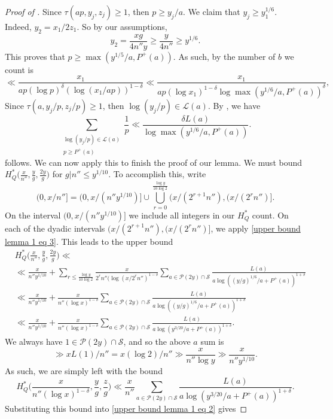 \documentclass{amsart}
\theoremstyle{definition}
\numberwithin{equation}{section}
\renewcommand{\S}{\mathcal{S}}
\newcommand{\density}{\delta}
\begin{document}
\begin{proof}[Proof of ]
		Since $\tau(ap,y_{j},z_j) \geq 1$, then $p \geq y_j/a.$ We claim that $y_j \geq y_1^{1/6}$. Indeed, $y_2 = x_1/2z_1.$ So by our assumptions,
		$$y_2 = \frac{x g}{4n'' y} \geq \frac{y}{4n''} \geq y^{1/6}.$$
		This proves that $p \geq \max(y^{1/5}/a,P^+(a))$. As such, by  the number of $b$ we count is
		$$\ll \frac{x_1}{ap (\log p)^\density (\log(x_1/ap))^{1-\density}} \ll \frac{x_1}{ap (\log x_1)^{1-\density} \log \max(y^{1/6}/a,P^+(a))^\density},$$
		Since $\tau(a,y_j/p,z_j/p) \geq 1$, then $\log(y_j/p) \in \mathscr{L}(a)$. By , we have
		$$\sum_{\substack{\log(y_j/p) \in \mathscr{L}(a) \\ p \geq P^+(a)}} \frac{1}{p} \ll  \frac{\density L(a)}{\log \max(y^{1/6}/a,P^+(a))}.$$
		 follows. We can now apply this to finish the proof of our lemma. We must bound $H^*_Q \big(\frac{x}{n''},\frac{y}{g},\frac{2y}{g}\big)$ for $g|n'' \leq y^{1/10}$. To accomplish this, write $$(0,x/n''] = (0,x/(n'' y^{1/10})] \cup \bigcup_{r = 0}^{\frac{\log y}{10 \log 2}} (x/(2^{r+1}n''),(x/(2^{r}n'')].$$
		On the interval $(0,x/(n'' y^{1/10})]$ we include all integers in our $H_Q^*$ count. On each of the dyadic intervals $(x/(2^{r+1}n''),(x/(2^{r}n'')]$, we apply \eqref{upper bound lemma 1 eq 3}. This leads to the upper bound
		\begin{align*}
			&H^*_Q \bigg(\frac{x}{n''},\frac{y}{g},\frac{2y}{g}\bigg) \ll \\ &\ll \frac{x}{n'' y^{1/10} } + \sum_{r \leq \frac{\log y}{10 \log 2}}\frac{x}{2^r n'' (\log (x/2^r n'')^{1-\density}}\sum_{a \in \mathscr{P}(2y) \cap \S}\frac{L(a)}{a \log((y/g)^{1/6}/a+P^+(a))^{1+\density}}\\
			&\ll \frac{x}{n'' y^{1/10} } + \frac{x}{n'' (\log x)^{1-\density}}\sum_{a \in \mathscr{P}(2y) \cap \S}\frac{L(a)}{a \log((y/g)^{1/6}/a+P^+(a))^{1+\density}}\\
			&\ll \frac{x}{n'' y^{1/10}} + \frac{x}{n'' (\log x)^{1-\density}}\sum_{a \in \mathscr{P}(2y) \cap \S}\frac{L(a)}{a \log(y^{3/20}/a+P^+(a))^{1+\density}}.
		\end{align*}
		We always have $1 \in \mathscr{P}(2y) \cap \S$, and so the above $a$ sum is $$ \gg x L(1)/n'' = x (\log 2)/n'' \gg \frac{x}{n'' \log y} \gg \frac{x}{n''y^{1/10}}.$$ As such, we are simply left with the bound
		$$	H^*_Q \bigg(\frac{x}{n'' (\log x)^{1-\density}},\frac{y}{g},\frac{z}{g}\bigg) \ll \frac{x}{n''}\sum_{a \in \mathscr{P}(2y) \cap \S}\frac{L(a)}{a \log(y^{3/20}/a+P^+(a))^{1+\density}}.$$
		Substituting this bound into \eqref{upper bound lemma 1 eq 2} gives

\end{proof}
\end{document}
